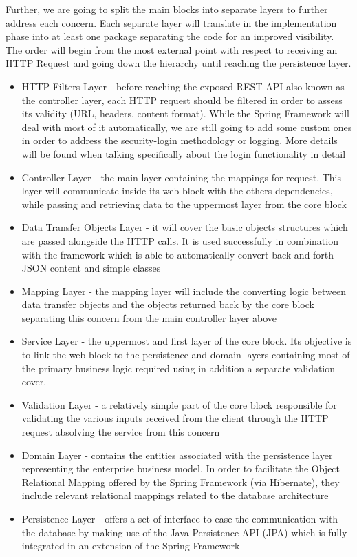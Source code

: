 Further, we are going to split the main blocks into separate layers to further address each concern. Each separate layer will translate in the implementation phase into at least one package separating the code for an improved visibility. The order will begin from the most external point with respect to receiving an HTTP Request and going down the hierarchy until reaching the persistence layer.

\begin{itemize}
    \item HTTP Filters Layer - before reaching the exposed REST API also known as the controller layer, each HTTP request should be filtered in order to assess its validity (URL, headers, content format). While the Spring Framework will deal with most of it automatically, we are still going to add some custom ones in order to address the security-login methodology or logging. More details will be found when talking specifically about the login functionality in detail
    \item Controller Layer - the main layer containing the mappings for request. This layer will communicate inside its web block with the others dependencies, while passing and retrieving data to the uppermost layer from the core block
    \item Data Transfer Objects Layer - it will cover the basic objects structures which are passed alongside the HTTP calls. It is used successfully in combination with the framework which is able to automatically convert back and forth JSON content and simple classes
    \item Mapping Layer - the mapping layer will include the converting logic between data transfer objects and the objects returned back by the core block separating this concern from the main controller layer above
    \item Service Layer - the uppermost and first layer of the core block. Its objective is to link the web block to the persistence and domain layers containing most of the primary business logic required using in addition a separate validation cover.
    \item Validation Layer - a relatively simple part of the core block responsible for validating the various inputs received from the client through the HTTP request absolving the service from this concern
    \item Domain Layer - contains the entities associated with the persistence layer representing the enterprise business model. In order to facilitate the Object Relational Mapping offered by the Spring Framework (via Hibernate), they include relevant relational mappings related to the database architecture
    \item Persistence Layer - offers a set of interface to ease the communication with the database by making use of the Java Persistence API (JPA) which is fully integrated in an extension of the Spring Framework
\end{itemize}

